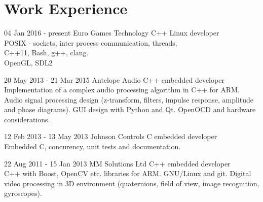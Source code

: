 \documentclass{tccv}
\begin{document}
\section{Work Experience}
\begin{eventlist}
\item{04 Jan 2016 - present}
     {Euro Games Technology}
     {C++ Linux developer}             \\
POSIX - sockets, inter process communication, threads.  \\
C++11, Bash, g++, clang.                                \\
OpenGL, SDL2

\item{20 May 2013 - 21 Mar 2015}
     {Antelope Audio}
     {C++ embedded developer}          \\
Implementation of a complex audio processing algorithm in C++ for ARM.
Audio signal processing design (z-transform, filters, impulse response, amplitude and phase diagrams).
GUI design with Python and Qt.
OpenOCD and hardware considerations.   \\

\item{12 Feb 2013 - 13 May 2013}
     {Johnson Controls}
     {C embedded developer} \\
Embedded C, concurency, unit tests and documentation.  \\

\item{22 Aug 2011 - 15 Jan 2013}
     {MM Solutions Ltd}
     {C++ embedded developer} \\
C++ with Boost, OpenCV etc. libraries for ARM.
GNU/Linux and git.
Digital video processing in 3D environment (quaternions, field of view, image recognition, gyroscopes).
\end{eventlist}
\end{document}
